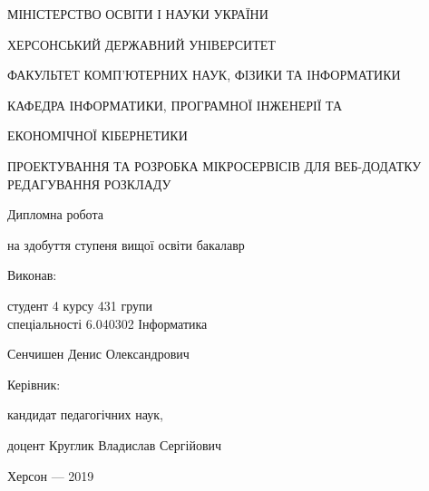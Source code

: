\thispagestyle{empty}

{\centering
МІНІСТЕРСТВО ОСВІТИ І НАУКИ УКРАЇНИ

ХЕРСОНСЬКИЙ ДЕРЖАВНИЙ УНІВЕРСИТЕТ

ФАКУЛЬТЕТ КОМП'ЮТЕРНИХ НАУК, ФІЗИКИ ТА ІНФОРМАТИКИ

КАФЕДРА ІНФОРМАТИКИ, ПРОГРАМНОЇ ІНЖЕНЕРІЇ ТА 

ЕКОНОМІЧНОЇ КІБЕРНЕТИКИ

\vfill

ПРОЕКТУВАННЯ ТА РОЗРОБКА МІКРОСЕРВІСІВ ДЛЯ ВЕБ-ДОДАТКУ РЕДАГУВАННЯ РОЗКЛАДУ

Дипломна робота

на здобуття ступеня вищої освіти бакалавр

}

\vfill

\hfill\begin{minipage}[t]{0.6\textwidth}
Виконав: 

студент 4 курсу 431 групи \\ спеціальності 6.040302  Інформатика

Сенчишен Денис Олександрович

Керівник:

кандидат педагогічних наук,

доцент Круглик Владислав Сергійович

\end{minipage}

\vfill

{\centering
Херсон --- 2019

}